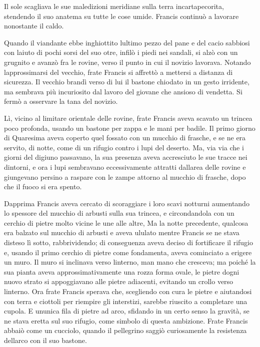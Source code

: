 Il sole scagliava le sue maledizioni meridiane sulla terra
incartapecorita, stendendo il suo anatema su tutte le cose umide.
Francis continuò a lavorare nonostante il caldo.

Quando il viandante ebbe inghiottito l\textquotesingle ultimo pezzo del
pane e del cacio sabbiosi con l\textquotesingle aiuto di pochi sorsi del
suo otre, infilò i piedi nei sandali, si alzò con un grugnito e avanzò
fra le rovine, verso il punto in cui il novizio lavorava. Notando
l\textquotesingle approssimarsi del vecchio, frate Francis si affrettò a
mettersi a distanza di sicurezza. Il vecchio brandì verso di lui il
bastone chiodato in un gesto irridente, ma sembrava più incuriosito dal
lavoro del giovane che ansioso di vendetta. Si fermò a osservare la tana
del novizio.

Lì, vicino al limitare orientale delle rovine, frate Francis aveva
scavato un trincea poco profonda, usando un bastone per zappa e le mani
per badile. Il primo giorno di Quaresima aveva coperto quel fossato con
un mucchio di frasche, e se ne era servito, di notte, come di un rifugio
contro i lupi del deserto. Ma, via via che i giorni del digiuno
passavano, la sua presenza aveva accresciuto le sue tracce nei dintorni,
e ora i lupi sembravano eccessivamente attratti
dall\textquotesingle area delle rovine e giungevano persino a raspare
con le zampe attorno al mucchio di frasche, dopo che il fuoco si era
spento.

Dapprima Francis aveva cercato di scoraggiare i loro scavi notturni
aumentando lo spessore del mucchio di arbusti sulla sua trincea, e
circondandola con un cerchio di pietre molto vicine le une alle altre,
Ma la notte precedente, qualcosa era balzato sul mucchio di arbusti e
aveva ululato mentre Francis se ne stava disteso lì sotto,
rabbrividendo; di conseguenza aveva deciso di fortificare il rifugio e,
usando il primo cerchio di pietre come fondamenta, aveva cominciato a
erigere un muro. Il muro si inclinava verso l\textquotesingle interno,
man mano che cresceva; ma poiché la sua pianta aveva approssimativamente
una rozza forma ovale, le pietre d\textquotesingle ogni nuovo strato si
appoggiavano alle pietre adiacenti, evitando un crollo verso
l\textquotesingle interno. Ora frate Francis sperava che, scegliendo con
cura le pietre e aiutandosi con terra e ciottoli per riempire gli
interstizi, sarebbe riuscito a completare una cupola. E
un\textquotesingle unica fila di pietre ad arco, sfidando in un certo
senso la gravità, se ne stava eretta sul suo rifugio, come simbolo di
questa ambizione. Frate Francis abbaiò come un cucciolo, quando il
pellegrino saggiò curiosamente la resistenza dell\textquotesingle arco
con il suo bastone.

